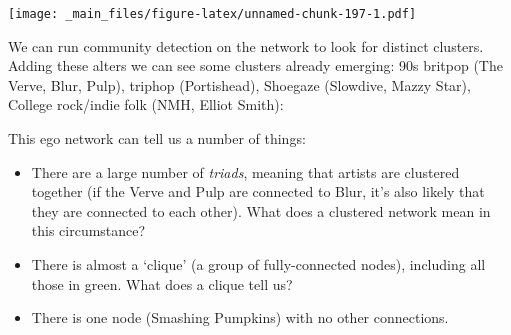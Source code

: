 \documentclass[
]{book}
\newenvironment{Shaded}{\begin{snugshade}}{\end{snugshade}}
\newcommand{\AttributeTok}[1]{\textcolor[rgb]{0.77,0.63,0.00}{#1}}
\newcommand{\DecValTok}[1]{\textcolor[rgb]{0.00,0.00,0.81}{#1}}
\newcommand{\FunctionTok}[1]{\textcolor[rgb]{0.00,0.00,0.00}{#1}}
\newcommand{\NormalTok}[1]{#1}
\newcommand{\SpecialCharTok}[1]{\textcolor[rgb]{0.00,0.00,0.00}{#1}}
\newcommand{\StringTok}[1]{\textcolor[rgb]{0.31,0.60,0.02}{#1}}
\begin{document}
\begin{Shaded}
\end{Shaded}

\texttt{[image: \_main\_files/figure-latex/unnamed-chunk-197-1.pdf]}

We can run community detection on the network to look for distinct clusters. Adding these alters we can see some clusters already emerging: 90s britpop (The Verve, Blur, Pulp), triphop (Portishead), Shoegaze (Slowdive, Mazzy Star), College rock/indie folk (NMH, Elliot Smith):

This ego network can tell us a number of things:

\begin{itemize}
\item
  There are a large number of \emph{triads}, meaning that artists are clustered together (if the Verve and Pulp are connected to Blur, it's also likely that they are connected to each other). What does a clustered network mean in this circumstance?
\item
  There is almost a `clique' (a group of fully-connected nodes), including all those in green. What does a clique tell us?
\item
  There is one node (Smashing Pumpkins) with no other connections.
\end{itemize}
\end{document}
